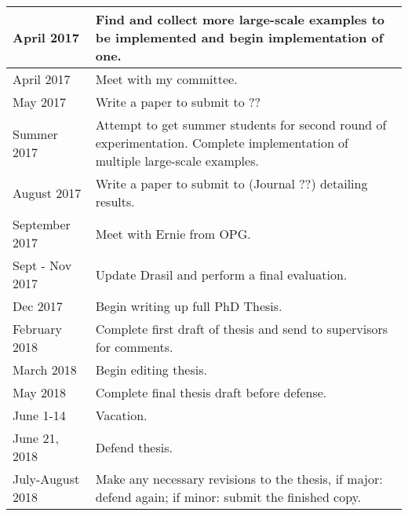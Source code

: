 \documentclass{article}
\begin{document}
\begin{table}
\begin{tabular}{|l|p{}|}
\\ \hline
      April 2017 & Find and collect more large-scale examples to be implemented 
        and begin implementation of one.
\\ \hline
      April 2017 & Meet with my committee.
\\ \hline
      May 2017 & Write a paper to submit to ?? %
\\ \hline
      Summer 2017 & Attempt to get summer students for second round of 
        experimentation. Complete implementation of multiple large-scale 
        examples.
\\ \hline
      August 2017 & Write a paper to submit to (Journal ??) detailing results.
\\ \hline
      September 2017 & Meet with Ernie from OPG.
\\ \hline
      Sept - Nov 2017 & Update Drasil and perform a final evaluation.
\\ \hline
      Dec 2017 & Begin writing up full PhD Thesis.
\\ \hline
      February 2018 & Complete first draft of thesis and send to supervisors for 
        comments.
\\ \hline
      March 2018 & Begin editing thesis.
\\ \hline
      May 2018 & Complete final thesis draft before defense.
\\ \hline
      June 1-14 & Vacation.
\\ \hline
      June 21, 2018 & Defend thesis.
\\ \hline
      July-August 2018 & Make any necessary revisions to the thesis, 
        if major: defend again;
        if minor: submit the finished copy.
\\ \hline
\end{tabular}
\label{table:schedule}
\end{table}


\newpage

\end{document}

